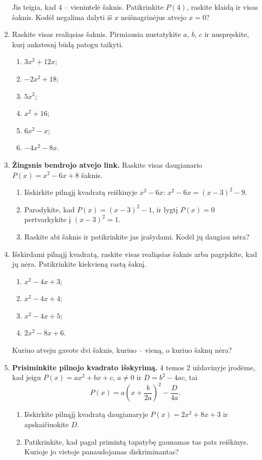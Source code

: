 \documentclass[12pt,a4paper]{article}
\begin{document}
\begin{enumerate}
\[\]
Jis teigia, kad $4$ – vienintelė šaknis. Patikrinkite $P(4)$, raskite klaidą ir visas šaknis. Kodėl negalima dalyti iš $x$ neišnagrinėjus atvejo $x=0$?
\item Raskite visas realiąsias šaknis. Pirmiausia nustatykite $a$, $b$, $c$ ir nuspręskite, kurį ankstesnį būdą patogu taikyti.
\begin{multicols}{2}\begin{enumerate}
\item $3x^2+12x$; \item $-2x^2+18$; \item $5x^2$; \item $x^2+16$; \item $6x^2-x$; \item $-4x^2-8x$.
\end{enumerate}\end{multicols}
\item \textbf{Žingsnis bendrojo atvejo link.} Raskite visas daugianario $P(x)=x^2-6x+8$ šaknis.
\begin{enumerate}
\item Išskirkite pilnąjį kvadratą reiškinyje $x^2-6x$: $x^2-6x=(x-3)^2-9$.
\item Parodykite, kad $P(x)=(x-3)^2-1$, ir lygtį $P(x)=0$ pertvarkykite į $(x-3)^2=1$.
\item Raskite abi šaknis ir patikrinkite jas įrašydami. Kodėl jų daugiau nėra?
\end{enumerate}
\item Išskirdami pilnąjį kvadratą, raskite visas realiąsias šaknis arba pagrįskite, kad jų nėra. Patikrinkite kiekvieną rastą šaknį.
\begin{enumerate}
\item $x^2-4x+3$; \item $x^2-4x+4$; \item $x^2-4x+5$; \item $2x^2-8x+6$.
\end{enumerate}
Kuriuo atveju gavote dvi šaknis, kuriuo – vieną, o kuriuo šaknų nėra?
\item \textbf{Prisiminkite pilnojo kvadrato išskyrimą.} 4 temos 2 uždavinyje įrodėme, kad jeigu $P(x)=ax^2+bx+c$, $a\ne0$ ir $D=b^2-4ac$, tai
\[
P(x)=a\left(x+\frac{b}{2a}\right)^2-\frac{D}{4a}.
\]
\begin{enumerate}
\item Išskirkite pilnąjį kvadratą daugianaryje $P(x)=2x^2+8x+3$ ir apskaičiuokite $D$.
\item Patikrinkite, kad pagal primintą tapatybę gaunamas tas pats reiškinys. Kurioje jo vietoje panaudojamas diskriminantas?

\end{enumerate}
\end{enumerate}
\end{document}
